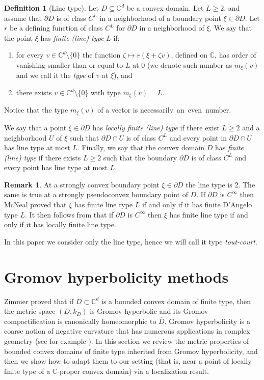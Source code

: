 \documentclass[11pt, reqno]{amsart}
\numberwithin{equation}{section}
\theoremstyle{definition}
\newtheorem{remark}[theorem]{Remark}
\newtheorem{definition}[theorem]{Definition}
\newcommand{\C}{\mathbb{C}}
\begin{document}
	
	\begin{definition}[Line type]
		\label{Def_Type}
		Let $D\subseteq \C^d$ be a convex domain. Let $L\geq 2$,  and assume that $\partial D$ is of class $C^L$ in a neighborhood of a boundary point   $\xi\in\partial D$. Let
		$r$ be a defining function of class $C^L$ for $\partial D$ in a neighborhood of $\xi$.
		We say that the point $\xi$ has {\sl finite (line)  type} $L$ if:
		\begin{enumerate}
			\item for every	$v\in\C^d\setminus\{0\}$   the function
			$\zeta \mapsto r(\xi+\zeta v)$, defined on  $\C$, has order of vanishing 
			smaller than or equal to $L$  at $0$ (we denote such number as $m_\xi(v)$ and we call it  the {\sl type} of $v$ at $\xi$), and
			\item there exists $v\in \C^{d}\setminus\{0\}$ with type $m_\xi(v)=L$.
		\end{enumerate}
		Notice that the type $m_\xi(v)$ of a vector is necessarily an even number.
		
		We say that a point $\xi\in \partial D$ has {\sl locally  finite  (line) type} if there exist $L\geq 2$ and a neighborhood $U$ of $\xi$ such that $\partial D\cap U$ is of class $C^L$ and every point in $\partial D\cap U$ has line type at most $L$.
		Finally, we say that the convex domain $D$ has {\sl finite (line) type} if there exists  $L\geq 2$ such that the boundary $\partial D$ is of class $C^L$ and every point has line type at most $L$.
	\end{definition}
	
	\begin{remark}
		At a strongly convex boundary point $\xi\in \partial D$ the line type is $2$. The same is true at a strongly pseudoconvex boundary point of $D$. 
		If  $\partial D$ is $C^\infty$  then 
		McNeal \cite{mcneal} proved that $\xi$  has finite line type $L$ if and only if it has finite D'Angelo type $L$.
		It then follows from \cite[Theorem 2 p. 131]{DAngelo} that if  $\partial D$ is $C^\infty$ then $\xi$ has finite line type if and only if it has locally finite line type.
	\end{remark}
	In this paper we consider only the line type, hence we will  call it type \emph{tout-court}.
	
	
	\section{Gromov hyperbolicity methods}
	
	Zimmer \cite{Zim} proved that if $D\subset\C^d$ is a  bounded convex domain of finite type, then the metric space $(D,k_D)$ is Gromov hyperbolic and its Gromov compactification is canonically homeomorphic to $\overline D$.  Gromov hyperbolicity is a coarse notion of negative curvature that has numerous applications in complex geometry (see for example  \cite{GS,BZ,Zimsub,BGZ,BNT,Fia,ADAF,AFGG,AFGK}).
	In this section we review the metric properties of bounded convex domains of finite type inherited from  Gromov hyperbolicity, and then we show how to adapt  them to our setting (that is, near a point of locally finite type of a $\C$-proper convex domain) via a localization result.
	
\end{document}
